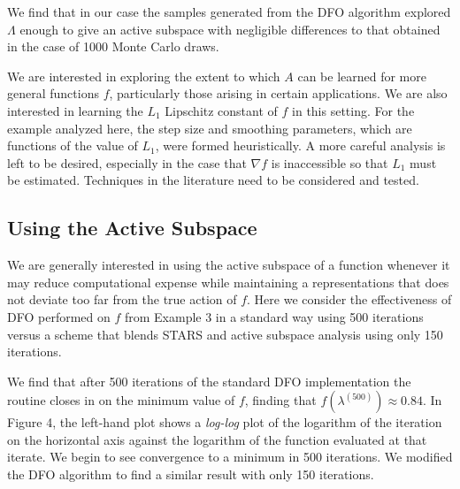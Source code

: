 \documentclass{amsart}
\begin{document}
We find that in our case the samples generated from the DFO algorithm explored $\Lambda$ enough to give an active subspace with negligible differences to that obtained in the case of 1000 Monte Carlo draws.

We are interested in exploring the extent to which $A$ can be learned for more general functions $f$, particularly those arising in certain applications. We are also interested in learning the $L_1$ Lipschitz constant of $f$ in this setting. For the example analyzed here, the step size and smoothing parameters, which are functions of the value of $L_1$, were formed heuristically. A more careful analysis is left to be desired, especially in the case that $\nabla f$ is inaccessible so that $L_1$ must be estimated. Techniques in the literature need to be considered and tested. 



\subsection{Using the Active Subspace} We are generally interested in using the active subspace of a function whenever it may reduce %
computational expense while maintaining a representations that does not deviate too far from the true action of $f$. Here we consider the effectiveness of DFO performed on $f$ from Example 3 in a standard way \cite{CW} using 500 iterations versus a scheme that blends STARS and active subspace analysis using only 150 iterations. 



We find that after 500 iterations of the standard DFO implementation the routine closes in on the minimum value of $f$, finding that $f\left(\lambda^{(500)}\right) \approx 0.84$. In Figure 4, the left-hand plot shows a \textit{log-log} plot of the logarithm of the iteration on the horizontal axis against the logarithm of the function evaluated at that iterate. We begin to see convergence to a minimum in 500 iterations.
We modified the DFO algorithm to find a similar result with only 150 iterations. 
\end{document}
